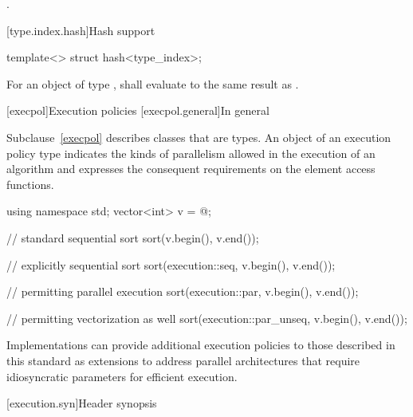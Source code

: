 \begin{itemdescr}
\pnum
\returns
{}.
\end{itemdescr}

[type.index.hash]{Hash support}

%
\begin{itemdecl}
template<> struct hash<type_index>;
\end{itemdecl}

\begin{itemdescr}
\pnum
For an object  of type ,
 shall evaluate to the same result as .
\end{itemdescr}

[execpol]{Execution policies}
[execpol.general]{In general}

\pnum
Subclause~\ref{execpol} describes classes that are  types. An
object of an execution policy type indicates the kinds of parallelism allowed
in the execution of an algorithm and expresses the consequent requirements on
the element access functions.
\begin{example}
\begin{codeblock}
using namespace std;
vector<int> v = @\commentellip@;

// standard sequential sort
sort(v.begin(), v.end());

// explicitly sequential sort
sort(execution::seq, v.begin(), v.end());

// permitting parallel execution
sort(execution::par, v.begin(), v.end());

// permitting vectorization as well
sort(execution::par_unseq, v.begin(), v.end());
\end{codeblock}
\end{example}
\begin{note}
Implementations can provide additional execution policies
to those described in this standard as extensions
to address parallel architectures that require idiosyncratic
parameters for efficient execution.
\end{note}

[execution.syn]{Header  synopsis}

